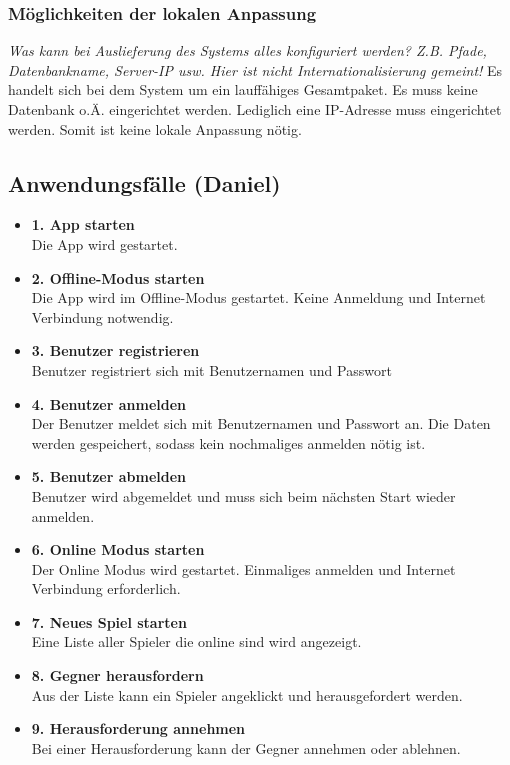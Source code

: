 \documentclass[fontsize=12pt,paper=a4,twoside]{scrartcl}
\begin{document}
\subsubsection{Möglichkeiten der lokalen Anpassung}
  {\em Was kann bei Auslieferung des Systems alles konfiguriert
  werden? Z.B. Pfade, Datenbankname, Server-IP usw. Hier ist nicht
  Internationalisierung gemeint!}
Es handelt sich bei dem System um ein lauffähiges Gesamtpaket. Es muss keine Datenbank o.Ä. eingerichtet werden. Lediglich eine IP-Adresse muss eingerichtet werden. Somit ist keine lokale Anpassung nötig.

\subsection{Anwendungsfälle (Daniel)}
\begin{itemize}
	\item \textbf{1. App starten}\\
	Die App wird gestartet. 
	\item \textbf{2. Offline-Modus starten}\\
	Die App wird im Offline-Modus gestartet. Keine Anmeldung und Internet Verbindung notwendig.
	\item \textbf{3. Benutzer registrieren}\\
	Benutzer registriert sich mit Benutzernamen und Passwort
	\item \textbf{4. Benutzer anmelden}\\
	Der Benutzer meldet sich mit Benutzernamen und Passwort an. Die Daten werden gespeichert, sodass kein nochmaliges anmelden nötig ist.
	\item \textbf{5. Benutzer abmelden}\\
	Benutzer wird abgemeldet und muss sich beim nächsten Start wieder anmelden.
	\item \textbf{6. Online Modus starten}\\
	Der Online Modus wird gestartet. Einmaliges anmelden und Internet Verbindung erforderlich.
	\item \textbf{7. Neues Spiel starten}\\
	Eine Liste aller Spieler die online sind wird angezeigt.
	\item \textbf{8. Gegner herausfordern}\\
	Aus der Liste kann ein Spieler angeklickt und herausgefordert werden.
	\item \textbf{9. Herausforderung annehmen}\\
	Bei einer Herausforderung kann der Gegner annehmen oder ablehnen.

\end{itemize}
\end{document}
